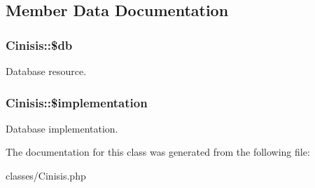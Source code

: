 \subsection{Member Data Documentation}
\hypertarget{classCinisis_ae8aedec88384439c95da89f423a219c0}{
\subsubsection[{\$db}]{\setlength{\rightskip}{0pt plus 5cm}Cinisis::\$db}}
\label{classCinisis_ae8aedec88384439c95da89f423a219c0}
Database resource. \hypertarget{classCinisis_ae537c5305e84e86ae7dd305d2cd253fc}{
\subsubsection[{\$implementation}]{\setlength{\rightskip}{0pt plus 5cm}Cinisis::\$implementation}}
\label{classCinisis_ae537c5305e84e86ae7dd305d2cd253fc}
Database implementation. 

The documentation for this class was generated from the following file:\begin{DoxyCompactItemize}
\item 
classes/Cinisis.php\end{DoxyCompactItemize}
